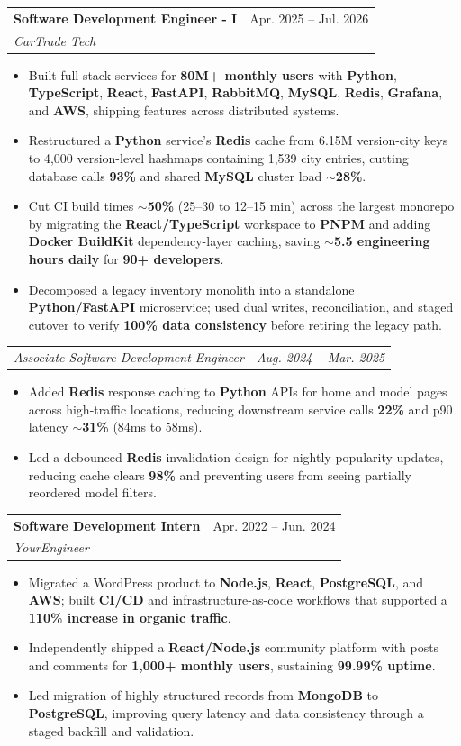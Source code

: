 \documentclass[letterpaper,11pt]{article}
\makeatletter
\newcommand{\resumeItem}[1]{
  \item\small{
    {#1 \vspace{-2pt}}
  }
}
\newcommand{\resumeSubheading}[4]{
  \vspace{-2pt}\item
    \begin{tabular*}{0.97\textwidth}[t]{l@{\extracolsep{\fill}}r}
      \textbf{#1} & #2 \\
      \textit{\small#3} & \textit{\small #4} \\
    \end{tabular*}\vspace{-7pt}
}
\newcommand{\resumeSubSubheading}[2]{
    \item
    \begin{tabular*}{0.97\textwidth}{l@{\extracolsep{\fill}}r}
      \textit{\small#1} & \textit{\small #2} \\
    \end{tabular*}\vspace{-7pt}
}
\newcommand{\resumeItemListStart}{\begin{itemize}}
\newcommand{\resumeItemListEnd}{\end{itemize}\vspace{-5pt}}
\makeatother
\begin{document}
\resumeSubheading
{Software Development Engineer - I}{Apr. 2025 -- Jul. 2026}
{CarTrade Tech}{ }
\resumeItemListStart
\resumeItem{Built full-stack services for \textbf{80M+ monthly users} with \textbf{Python}, \textbf{TypeScript}, \textbf{React}, \textbf{FastAPI}, \textbf{RabbitMQ}, \textbf{MySQL}, \textbf{Redis}, \textbf{Grafana}, and \textbf{AWS}, shipping features across distributed systems.}
\resumeItem{Restructured a \textbf{Python} service's \textbf{Redis} cache from 6.15M version-city keys to 4,000 version-level hashmaps containing 1,539 city entries, cutting database calls \textbf{93\%} and shared \textbf{MySQL} cluster load \textbf{$\sim$28\%}.}
\resumeItem{Cut CI build times \textbf{$\sim$50\%} (25--30 to 12--15 min) across the largest monorepo by migrating the \textbf{React/TypeScript} workspace to \textbf{PNPM} and adding \textbf{Docker BuildKit} dependency-layer caching, saving \textbf{$\sim$5.5 engineering hours daily} for \textbf{90+ developers}.}
\resumeItem{Decomposed a legacy inventory monolith into a standalone \textbf{Python/FastAPI} microservice; used dual writes, reconciliation, and staged cutover to verify \textbf{100\% data consistency} before retiring the legacy path.}
\resumeItemListEnd
\resumeSubSubheading
{Associate Software Development Engineer}{Aug. 2024 -- Mar. 2025}
\resumeItemListStart
\resumeItem{Added \textbf{Redis} response caching to \textbf{Python} APIs for home and model pages across high-traffic locations, reducing downstream service calls \textbf{22\%} and p90 latency \textbf{$\sim$31\%} (84ms to 58ms).}
\resumeItem{Led a debounced \textbf{Redis} invalidation design for nightly popularity updates, reducing cache clears \textbf{98\%} and preventing users from seeing partially reordered model filters.}
\resumeItemListEnd

\resumeSubheading
{Software Development Intern}{Apr. 2022 -- Jun. 2024}
{YourEngineer}{ }
\resumeItemListStart
\resumeItem{Migrated a WordPress product to \textbf{Node.js}, \textbf{React}, \textbf{PostgreSQL}, and \textbf{AWS}; built \textbf{CI/CD} and infrastructure-as-code workflows that supported a \textbf{110\% increase in organic traffic}.}
\resumeItem{Independently shipped a \textbf{React/Node.js} community platform with posts and comments for \textbf{1,000+ monthly users}, sustaining \textbf{99.99\% uptime}.}
\resumeItem{Led migration of highly structured records from \textbf{MongoDB} to \textbf{PostgreSQL}, improving query latency and data consistency through a staged backfill and validation.}
\resumeItemListEnd
\end{document}
